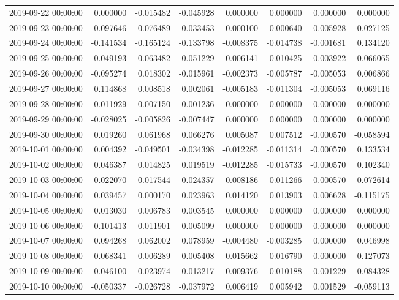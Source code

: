 \begin{tabular}{lrrrrrrr}
2019-09-22 00:00:00 & 0.000000 & -0.015482 & -0.045928 & 0.000000 & 0.000000 & 0.000000 & 0.000000 \\
2019-09-23 00:00:00 & -0.097646 & -0.076489 & -0.033453 & -0.000100 & -0.000640 & -0.005928 & -0.027125 \\
2019-09-24 00:00:00 & -0.141534 & -0.165124 & -0.133798 & -0.008375 & -0.014738 & -0.001681 & 0.134120 \\
2019-09-25 00:00:00 & 0.049193 & 0.063482 & 0.051229 & 0.006141 & 0.010425 & 0.003922 & -0.066065 \\
2019-09-26 00:00:00 & -0.095274 & 0.018302 & -0.015961 & -0.002373 & -0.005787 & -0.005053 & 0.006866 \\
2019-09-27 00:00:00 & 0.114868 & 0.008518 & 0.002061 & -0.005183 & -0.011304 & -0.005053 & 0.069116 \\
2019-09-28 00:00:00 & -0.011929 & -0.007150 & -0.001236 & 0.000000 & 0.000000 & 0.000000 & 0.000000 \\
2019-09-29 00:00:00 & -0.028025 & -0.005826 & -0.007447 & 0.000000 & 0.000000 & 0.000000 & 0.000000 \\
2019-09-30 00:00:00 & 0.019260 & 0.061968 & 0.066276 & 0.005087 & 0.007512 & -0.000570 & -0.058594 \\
2019-10-01 00:00:00 & 0.004392 & -0.049501 & -0.034398 & -0.012285 & -0.011314 & -0.000570 & 0.133534 \\
2019-10-02 00:00:00 & 0.046387 & 0.014825 & 0.019519 & -0.012285 & -0.015733 & -0.000570 & 0.102340 \\
2019-10-03 00:00:00 & 0.022070 & -0.017544 & -0.024357 & 0.008186 & 0.011266 & -0.000570 & -0.072614 \\
2019-10-04 00:00:00 & 0.039457 & 0.000170 & 0.023963 & 0.014120 & 0.013903 & 0.006628 & -0.115175 \\
2019-10-05 00:00:00 & 0.013030 & 0.006783 & 0.003545 & 0.000000 & 0.000000 & 0.000000 & 0.000000 \\
2019-10-06 00:00:00 & -0.101413 & -0.011901 & 0.005099 & 0.000000 & 0.000000 & 0.000000 & 0.000000 \\
2019-10-07 00:00:00 & 0.094268 & 0.062002 & 0.078959 & -0.004480 & -0.003285 & 0.000000 & 0.046998 \\
2019-10-08 00:00:00 & 0.068341 & -0.006289 & 0.005408 & -0.015662 & -0.016790 & 0.000000 & 0.127073 \\
2019-10-09 00:00:00 & -0.046100 & 0.023974 & 0.013217 & 0.009376 & 0.010188 & 0.001229 & -0.084328 \\
2019-10-10 00:00:00 & -0.050337 & -0.026728 & -0.037972 & 0.006419 & 0.005942 & 0.001529 & -0.059113 \\

\end{tabular}
